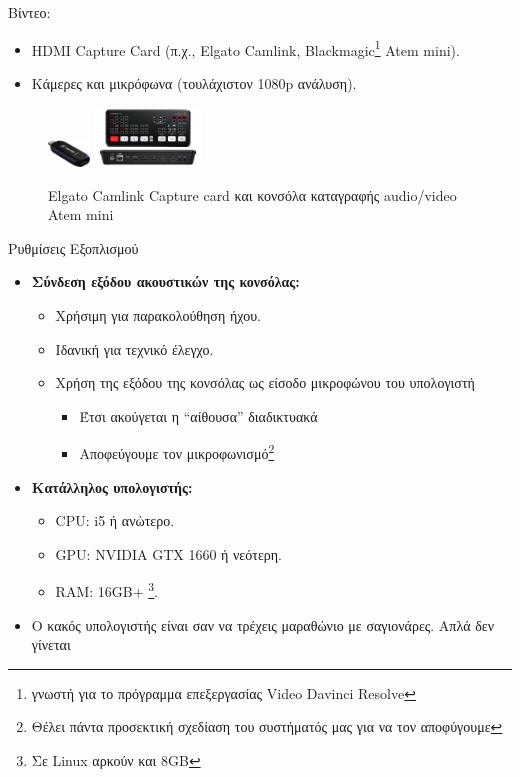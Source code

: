 \documentclass[aspectratio=169]{beamer}
\begin{document}
\begin{frame}{Βίντεο:}
  \begin{itemize}
  \item HDMI Capture Card (π.χ., Elgato Camlink, Blackmagic\footnote{γνωστή για το πρόγραμμα επεξεργασίας Video Davinci Resolve} Atem mini).
  \item Κάμερες και μικρόφωνα (τουλάχιστον 1080p ανάλυση).
  \end{itemize}
      \begin{figure}
    \centering
    \includegraphics[width=0.1\textwidth]{images/elgato.jpeg}
    \includegraphics[width=0.25\textwidth]{images/atem.jpg}
    \caption{Elgato Camlink Capture card και κονσόλα καταγραφής audio/video Atem mini}
    \end{figure}
\end{frame}

\begin{frame}{Ρυθμίσεις Εξοπλισμού}
  \begin{itemize}
  \item \textbf{Σύνδεση εξόδου ακουστικών της κονσόλας:}
    \begin{itemize}
    \item Χρήσιμη για παρακολούθηση ήχου.
    \item Ιδανική για τεχνικό έλεγχο.
    \item Χρήση της εξόδου της κονσόλας ως είσοδο μικροφώνου του υπολογιστή
      \begin{itemize}
      \item Έτσι ακούγεται η \enquote{αίθουσα} διαδικτυακά
      \item Αποφεύγουμε τον μικροφωνισμό\footnote{Θέλει πάντα προσεκτική σχεδίαση του συστήματός μας για να τον αποφύγουμε}
      \end{itemize}
    \end{itemize}
  \item \textbf{Κατάλληλος υπολογιστής:}
    \begin{itemize}
    \item CPU: i5 ή ανώτερο.
    \item GPU: NVIDIA GTX 1660 ή νεότερη.
    \item RAM: 16GB+ \footnote{Σε Linux αρκούν και 8GB}.
    \end{itemize}
  \item Ο κακός υπολογιστής είναι σαν να τρέχεις μαραθώνιο με σαγιονάρες. Απλά δεν γίνεται
  \end{itemize}
\end{frame}
\end{document}
